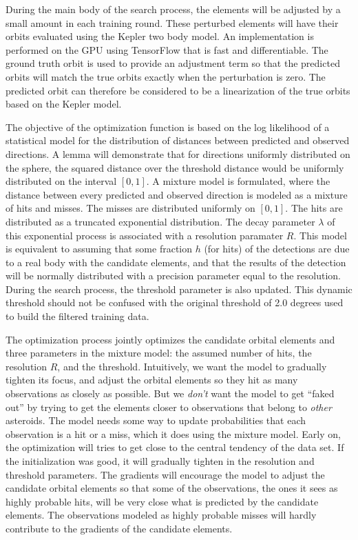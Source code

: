 During the main body of the search process, the elements will be adjusted by a small amount in each training round.
These perturbed elements will have their orbits evaluated using the Kepler two body model.
An implementation is performed on the GPU using TensorFlow that is fast and differentiable.
The ground truth orbit is used to provide an adjustment term so that the predicted orbits will match the true orbits exactly
when the perturbation is zero.
The predicted orbit can therefore be considered to be a linearization of the true orbits based on the Kepler model.

The objective of the optimization function is based on the log likelihood of a statistical model for the 
distribution of distances between predicted and observed directions.
A lemma will demonstrate that for directions uniformly distributed on the sphere, the squared distance over the 
threshold distance would be uniformly distributed on the interval $[0, 1]$.
A mixture model is formulated, where the distance between every predicted and observed direction is modeled as a mixture of hits and misses.
The misses are distributed uniformly on $[0, 1]$.
The hits are distributed as a truncated exponential distribution.
The decay parameter $\lambda$ of this exponential process is associated with a resolution paramater $R$.
This model is equivalent to assuming that some fraction $h$ (for hits) of the detections are due to 
a real body with the candidate elements, and that the results of the detection will be normally distributed 
with a precision parameter equal to the resolution.
During the search process, the threshold parameter is also updated.
This dynamic threshold should not be confused with the original threshold of 2.0 degrees used to build the filtered training data.

The optimization process jointly optimizes the candidate orbital elements and three parameters in the mixture model:
the assumed number of hits, the resolution $R$, and the threshold. 
Intuitively, we want the model to gradually tighten its focus, and adjust the orbital elements so they hit as many observations as closely as possible.
But we \textit{don't} want the model to get ``faked out'' by trying to get the elements closer to observations that belong to \textit{other} asteroids.
The model needs some way to update probabilities that each observation is a hit or a miss, which it does using the mixture model.
Early on, the optimization will tries to get close to the central tendency of the data set.
If the initialization was good, it will gradually tighten in the resolution and threshold parameters.
The gradients will encourage the model to adjust the candidate orbital elements so that some of the observations,
the ones it sees as highly probable hits, will be very close what is predicted by the candidate elements.
The observations modeled as highly probable misses will hardly contribute to the gradients of the candidate elements.

